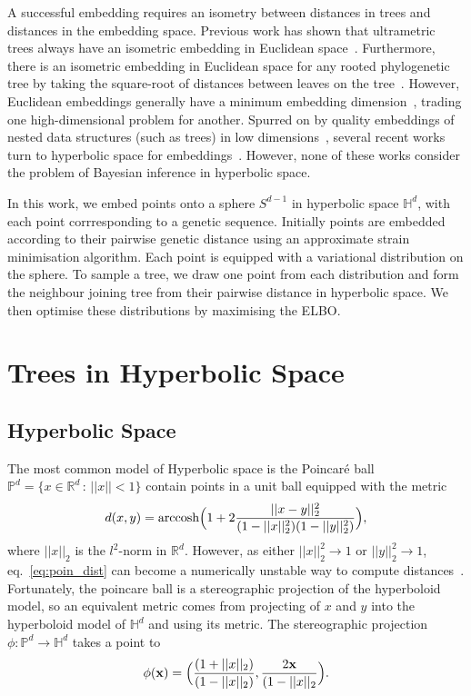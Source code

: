 \documentclass[11pt, twocolumn]{article}
\begin{document}
A successful embedding requires an isometry between distances in trees and distances in the embedding space. 
Previous work has shown that ultrametric trees always have an isometric embedding in Euclidean space~\cite{pavoine2005measuring}.
Furthermore, there is an isometric embedding in Euclidean space for any rooted phylogenetic tree by taking the square-root of distances between leaves on the tree~\cite{devienne2011euclidean}.
However, Euclidean embeddings generally have a minimum embedding dimension~\cite{deza1997geometry}, trading one high-dimensional problem for another.
Spurred on by quality embeddings of nested data structures (such as trees) in low dimensions~\cite{sala2018representation}, several recent works turn to hyperbolic space for embeddings~\cite{chami2020trees, wilson2021learning, matsumoto2020novel}.
However, none of these works consider the problem of Bayesian inference in hyperbolic space.

In this work, we embed points onto a sphere $S^{d-1}$ in hyperbolic space $\mathbb{H}^d$, with each point corrresponding to a genetic sequence.
Initially points are embedded according to their pairwise genetic distance using an approximate strain minimisation algorithm.
Each point is equipped with a variational distribution on the sphere.
To sample a tree, we draw one point from each distribution and form the neighbour joining tree from their pairwise distance in hyperbolic space.
We then optimise these distributions by maximising the ELBO.


\section{Trees in Hyperbolic Space}
\subsection{Hyperbolic Space}
The most common model of Hyperbolic space is the Poincaré ball $\mathbb{P}^{d} = \{x\in \mathbb{R}^{d} \,:\, ||x||<1\}$ contain points in a unit ball equipped with the metric
\begin{equation*}\label{eq:poin_dist}
    d(x,y) = \textnormal{arccosh}\Big(1 + 2 \frac{||x-y||_{2}^{2}}{ (1-||x||_{2}^{2}) (1-||y||_{2}^{2})}\Big),
\end{equation*}
where $||x||_{2}$ is the $l^{2}$-norm in $\mathbb{R}^{d}$.
However, as either $||x||_{2}^{2}\to 1$ or $||y||_{2}^{2} \to 1$, eq.~\ref{eq:poin_dist} can become a numerically unstable way to compute distances~\cite{sala2018representation}.
Fortunately, the poincare ball is a stereographic projection of the hyperboloid model, so an equivalent metric comes from projecting of $x$ and $y$ into the hyperboloid model of $\mathbb{H}^{d}$ and using its metric.
The stereographic projection $\phi:\mathbb{P}^{d} \to \mathbb{H}^{d}$ takes a point to
\begin{equation}
    \phi(\bold{x}) = \Big(\frac{(1+||x||_{2})}{(1-||x||_{2})}, \frac{2 \bold{x}}{(1- ||x||_{2}}\Big).    
\end{equation}
\end{document}
